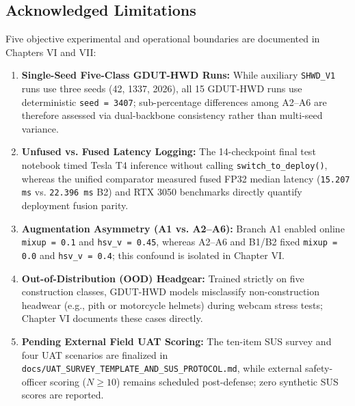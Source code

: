 \subsection{Acknowledged Limitations}

Five objective experimental and operational boundaries are documented in Chapters VI and VII:
\begin{enumerate}[leftmargin=1.8em, itemsep=2pt]
  \item \textbf{Single-Seed Five-Class GDUT-HWD Runs:} While auxiliary \texttt{SHWD\_V1} runs use three seeds (42, 1337, 2026), all 15 GDUT-HWD runs use deterministic \texttt{seed = 3407}; sub-percentage differences among A2--A6 are therefore assessed via dual-backbone consistency rather than multi-seed variance.
  \item \textbf{Unfused vs. Fused Latency Logging:} The 14-checkpoint final test notebook timed Tesla T4 inference without calling \nolinkurl{switch_to_deploy()}, whereas the unified comparator measured fused FP32 median latency (\texttt{15.207 ms} vs. \texttt{22.396 ms} B2) and RTX 3050 benchmarks directly quantify deployment fusion parity.
  \item \textbf{Augmentation Asymmetry (A1 vs. A2--A6):} Branch A1 enabled online \texttt{mixup = 0.1} and \texttt{hsv\_v = 0.45}, whereas A2--A6 and B1/B2 fixed \texttt{mixup = 0.0} and \texttt{hsv\_v = 0.4}; this confound is isolated in Chapter VI.
  \item \textbf{Out-of-Distribution (OOD) Headgear:} Trained strictly on five construction classes, GDUT-HWD models misclassify non-construction headwear (e.g., pith or motorcycle helmets) during webcam stress tests; Chapter VI documents these cases directly.
  \item \textbf{Pending External Field UAT Scoring:} The ten-item SUS survey and four UAT scenarios are finalized in \nolinkurl{docs/UAT_SURVEY_TEMPLATE_AND_SUS_PROTOCOL.md}, while external safety-officer scoring ($N \ge 10$) remains scheduled post-defense; zero synthetic SUS scores are reported.
\end{enumerate}
